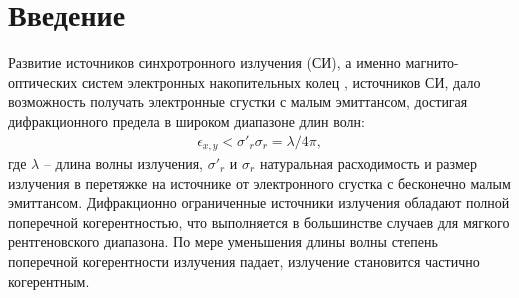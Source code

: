 \chapter*{Введение}	
\setcounter{page}{4}						%

\newcommand{\actuality}{Актуальность}
\newcommand{\aim}{\textbf{Целью}}
\newcommand{\tasks}{Задачи}
\newcommand{\defpositions}{\textbf{Основные положения, выносимые на~защиту:}}
\newcommand{\novelty}{\textbf{Научная новизна}}
\newcommand{\influence}{\textbf{Научная и практическая значимость}}
\newcommand{\reliability}{\textbf{Степень достоверности}}
\newcommand{\probation}{\textbf{Апробация работы.}}
\newcommand{\contribution}{\textbf{Личный вклад.}}
\newcommand{\publications}{\textbf{Публикации.}}



Развитие источников синхротронного излучения (СИ), а именно магнито-оптических систем электронных накопительных колец \cite{bartolini_challenges_2021}, \cite{hettel_challenges_2014} источников СИ, дало возможность получать электронные сгустки с малым эмиттансом, достигая дифракционного предела в широком диапазоне длин волн:
\begin{align}
	\epsilon_{x, y} < \sigma'_{r}\sigma_{r} = \lambda/4\pi,
	\label{eq:photons_emittance}
\end{align}
где $\lambda$ -- длина волны излучения, $\sigma'_{r}$ и $\sigma_{r}$ натуральная расходимость и размер излучения в перетяжке на источнике от электронного сгустка с бесконечно малым эмиттансом. Дифракционно ограниченные источники излучения обладают полной поперечной когерентностью, что выполняется в большинстве случаев для мягкого рентгеновского диапазона. По мере уменьшения длины волны степень поперечной когерентности излучения падает, излучение становится частично когерентным. 

